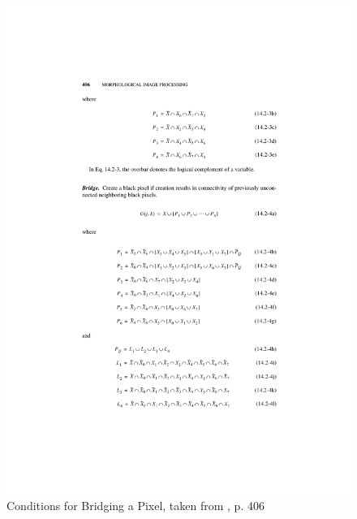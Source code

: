 \documentclass{article}
\begin{document}
\begin{figure}[hb]
 \includegraphics{images/bridge.pdf}
 \caption{Conditions for Bridging a Pixel, taken from \cite{Pratt:2001:DIP:516234}, p. 406}
 \label{fig:bridge}
\end{figure}
\end{document}
